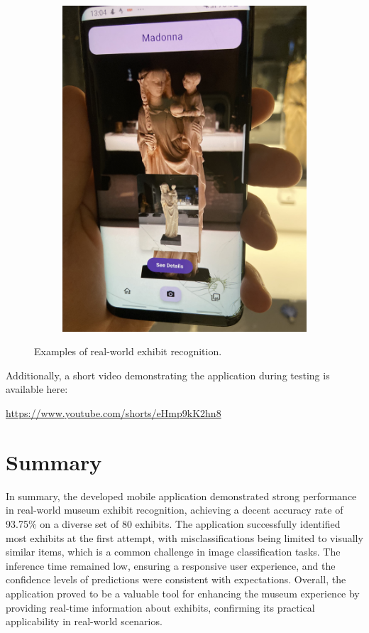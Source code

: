 \begin{figure}[h]
\begin{subfigure}[b]{0.4\textwidth}
        \includegraphics[angle=270, width=\textwidth]{img/test-example-4.jpg}
    \end{subfigure}

    \caption{Examples of real-world exhibit recognition.}\label{fig:test_examples}
\end{figure}

Additionally, a short video demonstrating the application during testing is available here:

\begin{center}
\url{https://www.youtube.com/shorts/eHmp9kK2hn8}
\end{center}

\section{Summary}

In summary, the developed mobile application demonstrated strong performance in real-world museum exhibit recognition, achieving a decent accuracy rate of 93.75\% on a diverse set of 80 exhibits. The application successfully identified most exhibits at the first attempt, with misclassifications being limited to visually similar items, which is a common challenge in image classification tasks. The inference time remained low, ensuring a responsive user experience, and the confidence levels of predictions were consistent with expectations. Overall, the application proved to be a valuable tool for enhancing the museum experience by providing real-time information about exhibits, confirming its practical applicability in real-world scenarios.